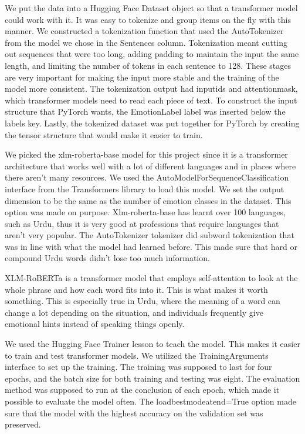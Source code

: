 \documentclass[12pt]{article}
\begin{document}
We put the data into a Hugging Face Dataset object so that a transformer model could work with it. It was easy to tokenize and group items on the fly with this manner. We constructed a tokenization function that used the AutoTokenizer from the model we chose in the Sentences column. Tokenization meant cutting out sequences that were too long, adding padding to maintain the input the same length, and limiting the number of tokens in each sentence to 128. These stages are very important for making the input more stable and the training of the model more consistent. The tokenization output had inputids and attentionmask, which transformer models need to read each piece of text. To construct the input structure that PyTorch wants, the EmotionLabel label was inserted below the labels key. Lastly, the tokenized dataset was put together for PyTorch by creating the tensor structure that would make it easier to train.

We picked the xlm-roberta-base model for this project since it is a transformer architecture that works well with a lot of different languages and in places where there aren't many resources. We used the AutoModelForSequenceClassification interface from the Transformers library to load this model. We set the output dimension to be the same as the number of emotion classes in the dataset. This option was made on purpose. Xlm-roberta-base has learnt over 100 languages, such as Urdu, thus it is very good at professions that require languages that aren't very popular. The AutoTokenizer tokenizer did subword tokenization that was in line with what the model had learned before. This made sure that hard or compound Urdu words didn't lose too much information.

XLM-RoBERTa is a transformer model that employs self-attention to look at the whole phrase and how each word fits into it. This is what makes it worth something. This is especially true in Urdu, where the meaning of a word can change a lot depending on the situation, and individuals frequently give emotional hints instead of speaking things openly.

We used the Hugging Face Trainer lesson to teach the model. This makes it easier to train and test transformer models. We utilized the TrainingArguments interface to set up the training. The training was supposed to last for four epochs, and the batch size for both training and testing was eight. The evaluation method was supposed to run at the conclusion of each epoch, which made it possible to evaluate the model often. The loadbestmodeatend=True option made sure that the model with the highest accuracy on the validation set was preserved.
\end{document}
